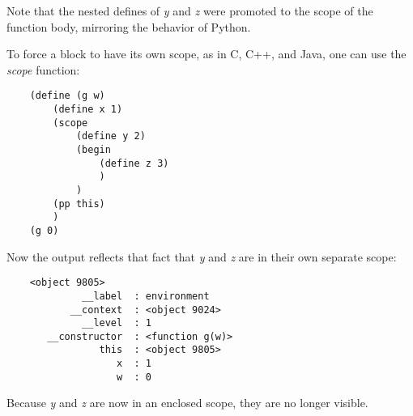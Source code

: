 Note that the nested defines of {\it y} and {\it z} were promoted
to the scope of the function body, mirroring the behavior of Python.

To force a block to have its own scope, as in C, C++, and Java,
one can use the {\it scope} function:

\begin{verbatim}
    (define (g w)
        (define x 1)
        (scope
            (define y 2)
            (begin
                (define z 3)
                )
            )
        (pp this)
        )
    (g 0)
\end{verbatim}

Now the output reflects that fact that {\it y} and {\it z} are in their own
separate scope:

\begin{verbatim}
    <object 9805>
             __label  : environment
           __context  : <object 9024>
             __level  : 1
       __constructor  : <function g(w)>
                this  : <object 9805>
                   x  : 1
                   w  : 0
\end{verbatim}

Because {\it y} and {\it z} are now in an enclosed scope,
they are no longer visible.

